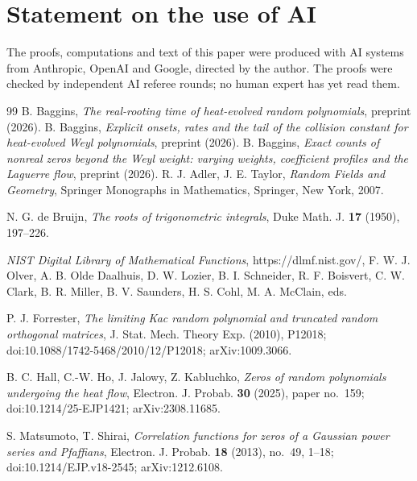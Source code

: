 \documentclass[11pt]{amsart}
\theoremstyle{definition}
\theoremstyle{remark}
\numberwithin{equation}{section}
\begin{document}
\section*{Statement on the use of AI}
The proofs, computations and text of this paper were produced with AI systems from Anthropic, OpenAI and Google, directed by the author. The proofs were checked by independent AI referee rounds; no human expert has yet read them.

\begin{thebibliography}{99}
 B. Baggins, \emph{The real-rooting time of heat-evolved random polynomials}, preprint (2026).
 B. Baggins, \emph{Explicit onsets, rates and the tail of the collision constant for heat-evolved Weyl polynomials}, preprint (2026).
 B. Baggins, \emph{Exact counts of nonreal zeros beyond the Weyl weight: varying weights, coefficient profiles and the Laguerre flow}, preprint (2026).
 R. J. Adler, J. E. Taylor, \emph{Random Fields and Geometry}, Springer Monographs in Mathematics, Springer, New York, 2007.

 N. G. de Bruijn, \emph{The roots of trigonometric integrals}, Duke Math. J. \textbf{17} (1950), 197--226.

 \emph{NIST Digital Library of Mathematical Functions}, https://dlmf.nist.gov/, F. W. J. Olver, A. B. Olde Daalhuis, D. W. Lozier, B. I. Schneider, R. F. Boisvert, C. W. Clark, B. R. Miller, B. V. Saunders, H. S. Cohl, M. A. McClain, eds.

 P. J. Forrester, \emph{The limiting Kac random polynomial and truncated random orthogonal matrices}, J. Stat. Mech. Theory Exp. (2010), P12018; doi:10.1088/1742-5468/2010/12/P12018; arXiv:1009.3066.

 B. C. Hall, C.-W. Ho, J. Jalowy, Z. Kabluchko, \emph{Zeros of random polynomials undergoing the heat flow}, Electron. J. Probab. \textbf{30} (2025), paper no.~159; doi:10.1214/25-EJP1421; arXiv:2308.11685.

 S. Matsumoto, T. Shirai, \emph{Correlation functions for zeros of a Gaussian power series and Pfaffians}, Electron. J. Probab. \textbf{18} (2013), no.~49, 1--18; doi:10.1214/EJP.v18-2545; arXiv:1212.6108.


\end{thebibliography}
\end{document}
